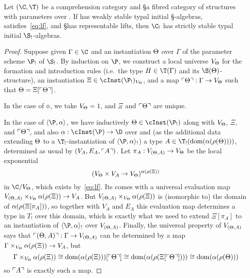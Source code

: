 \begin{enumerate}
\begin{enumerate}
\begin{thm}\label{thm:lu-str-param}
  Let $(\C,\T)$ be a comprehension category and \S a fibred category of structures with parameters over \C.
  If \C has weakly stable typal initial \S-algebras, \C satisfies~\eqref{eq:lf}, and \S has representable lifts, then $\C_!$ has strictly stable typal initial $\S_!$-algebras.
\end{thm}
\begin{proof}
  Suppose given $\Gamma\in\C$ and an instantiation $\Theta$ over $\Gamma$ of the parameter scheme $\P_!$ of $\S_!$.
  By induction on $\P$, we construct a local universe $V_\Theta$ for the formation and introduction rules (i.e.\ the type $H\in\T(\Gamma)$ and its $\S(\Th)$-structure), an instantiation $\Xi\in\cInst(\P_!)_{V_\Th}$, and a map $\ulcorner \Theta\urcorner : \Gamma\to V_\Theta$ such that $\Theta = \Xi[\ulcorner \Theta\urcorner]$.

  In the case of $\diamond$, we take $V_\Theta = 1$, and $\Xi$ and $\ulcorner \Theta\urcorner$ are unique.

  In the case of $\typeps{\P}{\al}$, we have inductively $\Th\in\cInst(\P_!)$ along with $V_\Theta$, $\Xi$, and $\ulcorner \Theta\urcorner$, and also $\al:\cInst(\P)\to\D$ over \C and (as the additional data extending $\Theta$ to a $\T_!$-instantiation of $\typeps{\P}{\al}_!$) a type $A\in\T_!(\mathrm{dom}(\al(\rho(\Th))))$, determined as usual by $(V_A,E_A,\ulcorner A\urcorner)$.
  Let $\pi_A : V_{(\Theta,A)}\to V_\Theta$ be the local exponential 
  \[ (V_\Theta \times V_A \to V_\Theta)^{\alpha(\rho(\Xi))} \]
  in $\C/V_\Th$, which exists by~\eqref{eq:lf}.
  Its comes with a universal evaluation map $V_{(\Theta,A)} \times_{V_\Theta} \alpha(\rho(\Xi)) \to V_A$.
  But $V_{(\Theta,A)} \times_{V_\Theta} \alpha(\rho(\Xi))$ is (isomorphic to) the domain of $\alpha(\rho(\Xi[\pi_A]))$, so together with $V_A$ and $E_A$ this evaluation map determines a type in $T_!$ over this domain, which is exactly what we need to extend $\Xi[\pi_A]$ to an instantiation of $\typeps{\P}{\al}_!$ over $V_{(\Theta,A)}$.
  Finally, the universal property of $V_{(\Theta,A)}$ says that $\ulcorner (\Theta,A)\urcorner : \Gamma \to V_{(\Theta,A)}$ can be determined by a map $\Gamma \times_{V_\Theta} \alpha(\rho(\Xi)) \to V_A$, but
  \[\Gamma \times_{V_\Theta} \alpha(\rho(\Xi)) \cong \mathrm{dom}(\alpha(\rho(\Xi)))[\ulcorner \Theta\urcorner] \cong \mathrm{dom}(\alpha(\rho(\Xi[\ulcorner \Theta\urcorner]))) \cong \mathrm{dom}(\alpha(\rho(\Theta)))  \]
  so $\ulcorner A\urcorner$ is exactly such a map.


\end{proof}
\end{enumerate}
\end{enumerate}
